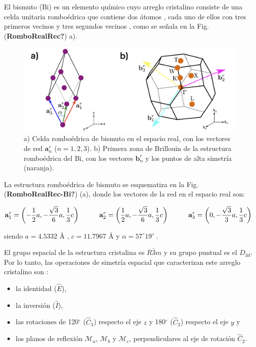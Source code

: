 \documentclass[
  letterpaper,
  DIV=11,
  numbers=noendperiod]{scrreprt}
\providecommand{\tightlist}{%
  \setlength{\itemsep}{0pt}\setlength{\parskip}{0pt}}\usepackage{longtable,booktabs,array}
\begin{document}
El bismuto (Bi) es un elemento químico cuyo arreglo cristalino consiste
de una celda unitaria romboédrica que contiene dos átomos
\cite{Falicov1965}, cada uno de ellos con tres primeros vecinos y tres
segundos vecinos \cite{HOFMANN2006}, como se señala en la Fig.
(\textbf{RomboRealRec?}) a).

\begin{figure}

{\centering \includegraphics{./images/RombRealRec.png}

}

\caption{a) Celda romboédrica de bismuto en el espacio real, con los
vectores de red \(\mathbf{a}^r_n\) (\(n=1,2,3\)). b) Primera zona de
Brillouin de la estructura romboédrica del Bi, con los vectores
\(\mathbf{b}^r_n\) y los puntos de alta simetría (naranja).}

\end{figure}

La estructura romboédrica de bismuto se esquematiza en la Fig.
(\textbf{RomboRealRec-Bi?}) (a), donde los vectores de la red en el
espacio real son:

\[
    \mathbf{a}_1^r = \left ( -\frac{1}{2}a , -\frac{\sqrt{3}}{6}a , \frac{1}{3}c \right ) \hspace{10mm}
    \mathbf{a}_2^r = \left (  \frac{1}{2}a , -\frac{\sqrt{3}}{6}a , \frac{1}{3}c \right ) \hspace{10mm}
    \mathbf{a}_3^r = \left (             0 , -\frac{\sqrt{3}}{3}a , \frac{1}{3}c \right ) 
\]

\noindent siendo \(a=4.5332\) Å , \(c= 11.7967\) Å y
\(\alpha = 57^{\circ}19'\) \cite{LiuandAllen1995}.

El grupo espacial de la estructura cristalina es \(R\bar{3}m\) y su
grupo puntual es el \(D_{3d}\). Por lo tanto, las operaciones de
simetría espacial que caracterizan este arreglo cristalino son
\cite{Hsu2019}:

\begin{itemize}
\tightlist
\item
  la identidad (\(\hat{E}\)),
\item
  la inversión (\(\hat{I}\)),
\item
  las rotaciones de 120\(^{\circ}\) (\(\hat{C}_3\)) respecto el eje
  \(z\) y 180\(^{\circ}\) (\(\hat{C}_2\)) respecto el eje \(y\) y
\item
  los planos de reflexión \(\mathcal{M}_a\), \(\mathcal{M}_b\) y
  \(\mathcal{M}_c\), perpendiculares al eje de rotación \(\hat{C}_2\).
\end{itemize}
\end{document}
